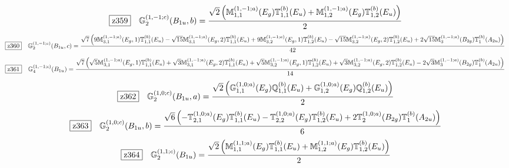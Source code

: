 \documentclass[fleqn,10pt,landscape]{jsarticle}
\begin{document}
\begin{dmath*}
\hspace*{3mm}\fbox{z359}\quad \mathbb{G}_{2}^{(1,-1;c)}(B_{1u},b)=\frac{\sqrt{2} \left(\mathbb{M}_{1,1}^{(1,-1;a)}(E_{g}) \mathbb{T}_{1,1}^{(b)}(E_{u}) + \mathbb{M}_{1,2}^{(1,-1;a)}(E_{g}) \mathbb{T}_{1,2}^{(b)}(E_{u})\right)}{2}
\end{dmath*}
\begin{dmath*}
\hspace*{3mm}\fbox{z360}\quad \mathbb{G}_{2}^{(1,-1;c)}(B_{1u},c)=\frac{\sqrt{7} \left(9 \mathbb{M}_{3,1}^{(1,-1;a)}(E_{g},1) \mathbb{T}_{1,1}^{(b)}(E_{u}) - \sqrt{15} \mathbb{M}_{3,1}^{(1,-1;a)}(E_{g},2) \mathbb{T}_{1,1}^{(b)}(E_{u}) + 9 \mathbb{M}_{3,2}^{(1,-1;a)}(E_{g},1) \mathbb{T}_{1,2}^{(b)}(E_{u}) - \sqrt{15} \mathbb{M}_{3,2}^{(1,-1;a)}(E_{g},2) \mathbb{T}_{1,2}^{(b)}(E_{u}) + 2 \sqrt{15} \mathbb{M}_{3}^{(1,-1;a)}(B_{2g}) \mathbb{T}_{1}^{(b)}(A_{2u})\right)}{42}
\end{dmath*}
\begin{dmath*}
\hspace*{3mm}\fbox{z361}\quad \mathbb{G}_{4}^{(1,-1;c)}(B_{1u})=\frac{\sqrt{7} \left(\sqrt{5} \mathbb{M}_{3,1}^{(1,-1;a)}(E_{g},1) \mathbb{T}_{1,1}^{(b)}(E_{u}) + \sqrt{3} \mathbb{M}_{3,1}^{(1,-1;a)}(E_{g},2) \mathbb{T}_{1,1}^{(b)}(E_{u}) + \sqrt{5} \mathbb{M}_{3,2}^{(1,-1;a)}(E_{g},1) \mathbb{T}_{1,2}^{(b)}(E_{u}) + \sqrt{3} \mathbb{M}_{3,2}^{(1,-1;a)}(E_{g},2) \mathbb{T}_{1,2}^{(b)}(E_{u}) - 2 \sqrt{3} \mathbb{M}_{3}^{(1,-1;a)}(B_{2g}) \mathbb{T}_{1}^{(b)}(A_{2u})\right)}{14}
\end{dmath*}
\begin{dmath*}
\hspace*{3mm}\fbox{z362}\quad \mathbb{G}_{2}^{(1,0;c)}(B_{1u},a)=\frac{\sqrt{2} \left(\mathbb{G}_{1,1}^{(1,0;a)}(E_{g}) \mathbb{Q}_{1,1}^{(b)}(E_{u}) + \mathbb{G}_{1,2}^{(1,0;a)}(E_{g}) \mathbb{Q}_{1,2}^{(b)}(E_{u})\right)}{2}
\end{dmath*}
\begin{dmath*}
\hspace*{3mm}\fbox{z363}\quad \mathbb{G}_{2}^{(1,0;c)}(B_{1u},b)=\frac{\sqrt{6} \left(- \mathbb{T}_{2,1}^{(1,0;a)}(E_{g}) \mathbb{T}_{1,1}^{(b)}(E_{u}) - \mathbb{T}_{2,2}^{(1,0;a)}(E_{g}) \mathbb{T}_{1,2}^{(b)}(E_{u}) + 2 \mathbb{T}_{2}^{(1,0;a)}(B_{2g}) \mathbb{T}_{1}^{(b)}(A_{2u})\right)}{6}
\end{dmath*}
\begin{dmath*}
\hspace*{3mm}\fbox{z364}\quad \mathbb{G}_{2}^{(1,1;c)}(B_{1u})=\frac{\sqrt{2} \left(\mathbb{M}_{1,1}^{(1,1;a)}(E_{g}) \mathbb{T}_{1,1}^{(b)}(E_{u}) + \mathbb{M}_{1,2}^{(1,1;a)}(E_{g}) \mathbb{T}_{1,2}^{(b)}(E_{u})\right)}{2}
\end{dmath*}
\end{document}
